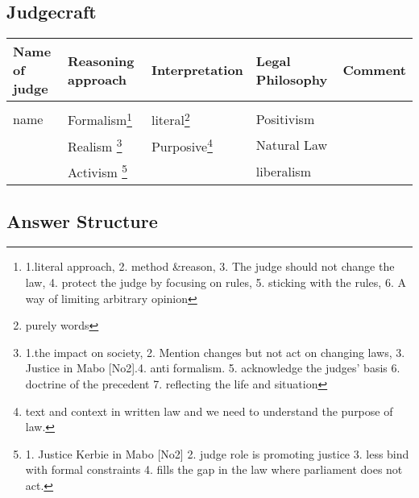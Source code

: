 \subsection*{Judgecraft}
\begin{minipage}{\textwidth}
\begin{tabular}{lllll}
     Name of judge & Reasoning approach & Interpretation & Legal Philosophy & Comment  \\
     \hline \\
     name   & Formalism\footnote{1.literal approach, 2. method \&reason, 3. The judge should not change the law, 4. protect the judge by focusing on rules, 5. sticking with the rules, 6. A way of limiting arbitrary opinion} & literal\footnote{purely words} & Positivism & {} \\
     {} & Realism \footnote{1.the impact on society, 2. Mention changes but not act on changing laws, 3. Justice in Mabo [No2].4. anti formalism. 5. acknowledge the judges' basis 6. doctrine of the precedent 7. reflecting the life and situation}& Purposive\footnote{text and context in written law and we need to understand the purpose of law.} & Natural Law &{}\\
     {} & Activism \footnote{1. Justice Kerbie in Mabo [No2] 2. judge role is promoting justice 3. less bind with formal constraints 4. fills the gap in the law where parliament does not act.} &{} &liberalism & {}
\end{tabular}
\end{minipage}

\subsection*{Answer Structure}

